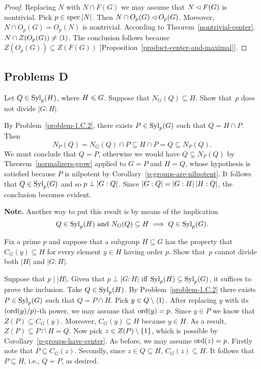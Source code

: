 \begin{proof} Replacing $N$ with $N\cap F(G)$ we may assume that $N\lhd F(G)$ is nontrivial. Pick $p\in\operatorname{spec}|N|$. Then $N\cap O_p(G)\lhd O_p(G)$. Moreover, $N\cap O_p(G)=O_p(N)$ is nontrivial. According to Theorem~\ref{nontrivial-center}, $N\cap Z(O_p(G))\ne\langle1\rangle$. The conclusion follows because $Z(O_p(G))\subseteq Z(F(G))$ [Proposition~\ref{product-center-and-maximal}].  \end{proof}

\subsection{Problems D}

\begin{probl}\label{problem-1.D.1}
    Let $Q\in{\rm Syl}_p(H)$, where $H \leqslant G$. Suppose that\/ $N_G(Q)\subseteq H$. Show that\/~$p$ does not divide $|G:H|$.
\end{probl}

\begin{solution} By Problem~\ref{problem-1.C.2}, there exists $P\in{\rm Syl}_p(G)$ such that $Q=H\cap P$. Then
$$
    N_P(Q)=N_G(Q)\cap P\subseteq H\cap P=Q \subseteq N_P(Q).
$$
We must conclude that $Q=P$, otherwise we would have $Q\varsubsetneq N_P(Q)$ by Theorem~\ref{normalizers-grow} applied to $G=P$ and $H=Q$, whose hypothesis is satisfied because $P$ is nilpotent by Corollary~\ref{p-groups-are-nilpotent}. It follows that $Q\in{\rm Syl}_p(G)$ and so $p\perp\left\vert{G:Q}\right\vert$. Since $\left\vert{G:Q}\right\vert=\left\vert{G:H}\right\vert\left\vert{H:Q}\right\vert$, the conclusion becomes evident. 

\textbf{Note.} Another way to put this result is by means of the implication
$$
    Q\in{\rm Syl}_p(H)\text{ and }N_G(Q)\subseteq H\implies Q\in{\rm Syl}_p(G).
$$
 \end{solution}


\begin{probl}
    Fix a prime\/ $p$ and suppose that a subgroup\/ $H \subseteq G$ has the property that\/ $C_G(y) \subseteq H$ for every element $y \in H$ having order\/ $p$. Show that\/~$p$ cannot divide both\/ $|H|$ and\/ $|G:H|$.
\end{probl}

\begin{solution}  
Suppose that $p\mid|H|$. Given that $p\perp|G:H|$ iff ${\rm Syl}_p(H)\subseteq{\rm Syl}_p(G)$, it suffices to prove the inclusion. Take $Q\in{\rm Syl}_p(H)$. By Problem~\ref{problem-1.C.2} there exists $P\in{\rm Syl}_p(G)$ such that $Q=P\cap H$. Pick $y\in Q\setminus\langle1\rangle$. After replacing $y$ with its $({\rm ord}(y)/p)$-th power, we may assume that ${\rm ord}(y)=p$. Since $y\in P$ we know that $Z(P)\subseteq C_G(y)$. Moreover, $C_G(y)\subseteq H$ because $y\in H$. As a result, $Z(P)\subseteq P\cap H=Q$. Now pick $z\in Z(P)\setminus\{1\}$, which is possible by Corollary~\ref{p-groups-have-center}. As before, we may assume ${\rm ord}(z)=p$. Firstly note that $P\subseteq C_G(z)$. Secondly, since $z\in Q\subseteq H$, $C_G(z)\subseteq H$. It follows that $P\subseteq H$, i.e., $Q=P$, as desired.  \end{solution}


